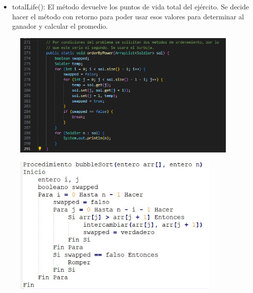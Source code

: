 \documentclass{article}
\begin{document}
	
	\begin{itemize}	
		\item totalLife(): El método devuelve los puntos de vida total del ejército. Se decide hacer el método con retorno para poder usar esos valores para determinar al ganador y calcular el promedio.
	\end{itemize}
	
	
	
	
	
	\begin{figure}[H]
		\centering
		\includegraphics[width=0.98\textwidth,keepaspectratio]{img/orderByPower.png}
	\end{figure}
	
	\begin{figure}[H]
		\centering
		\includegraphics[width=0.9\textwidth,keepaspectratio]{img/burbuja.jpg}
	\end{figure}
	
\end{document}
